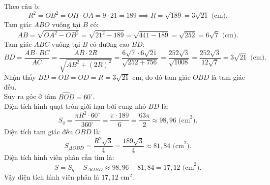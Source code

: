 \begin{bt}
{\begin{enumerate}[a)]
	Theo câu b:
	$$R^2 = OB^2 = OH \cdot OA = 9 \cdot 21 = 189 \implies R = \sqrt{189} = 3\sqrt{21}\text{ (cm)}.$$
	Tam giác $ABO$ vuông tại $B$ có:
	$$AB = \sqrt{OA^2 - OB^2} = \sqrt{21^2 - 189} = \sqrt{441 - 189} = \sqrt{252} = 6\sqrt{7}\text{ (cm)}.$$
	Tam giác $ABC$ vuông tại $B$ có đường cao $BD$:
	$$BD = \dfrac{AB \cdot BC}{AC} = \dfrac{AB \cdot 2R}{\sqrt{AB^2 + (2R)^2}} = \dfrac{6\sqrt{7} \cdot 6\sqrt{21}}{\sqrt{252 + 756}} = \dfrac{252\sqrt{3}}{\sqrt{1008}} = \dfrac{252\sqrt{3}}{12\sqrt{7}} = 3\sqrt{21}\text{ (cm)}.$$
	Nhận thấy $BD = OB = OD = R = 3\sqrt{21}\text{ cm}$, do đó tam giác $OBD$ là tam giác đều.\\
	Suy ra góc ở tâm $\widehat{BOD} = 60^\circ$.\\
	Diện tích hình quạt tròn giới hạn bởi cung nhỏ $BD$ là:
	$$S_q = \dfrac{\pi R^2 \cdot 60^\circ}{360^\circ} = \dfrac{\pi \cdot 189}{6} = \dfrac{63\pi}{2} \approx 98{,}96\text{ (cm}^2\text{)}.$$
	Diện tích tam giác đều $OBD$ là:
	$$S_{\Delta OBD} = \dfrac{R^2\sqrt{3}}{4} = \dfrac{189\sqrt{3}}{4} \approx 81{,}84\text{ (cm}^2\text{)}.$$
	Diện tích hình viên phân cần tìm là:
	$$S = S_q - S_{\Delta OBD} \approx 98{,}96 - 81{,}84 = 17{,}12\text{ (cm}^2\text{)}.$$
	Vậy diện tích hình viên phân là $17{,}12\text{ cm}^2$.
\end{enumerate}
}
\end{bt}
